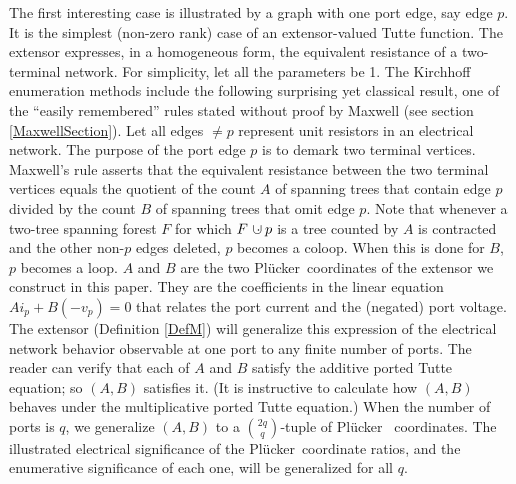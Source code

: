 \documentclass[12pt]{article}
\theoremstyle{definition}
\newcommand{\dunion}
{\mbox{\hbox{\hskip6pt$\cdot$\hskip-5.50pt$\cup$\hskip2pt}}}
\newcommand{\Plucker}{Pl\"{u}cker\ }
\begin{document}
The first interesting case is illustrated by
a graph with one port edge, say edge  $p$.
It is the simplest (non-zero rank) case of an extensor-valued 
Tutte function.  The extensor expresses, in a homogeneous form,
the equivalent resistance of a two-terminal network.
For simplicity, let all the parameters be 1.
The Kirchhoff enumeration methods include the following surprising yet
classical result, one of the ``easily remembered''
rules stated without proof by Maxwell\cite{MaxR}
(see section \ref{MaxwellSection}).
Let all edges $\neq p$ represent unit resistors in an
electrical network.  The purpose of the port edge $p$ is to 
demark two terminal vertices.  Maxwell's rule asserts 
that the equivalent resistance between the two terminal vertices 
equals the quotient of the count $A$ of spanning trees that
contain edge $p$ divided by the count $B$ of spanning trees 
that omit edge $p$.  Note that whenever a two-tree spanning forest $F$ 
for which $F\dunion p$ is a tree counted by $A$ is contracted and the 
other non-$p$ edges deleted,
$p$ becomes a coloop.  When this is done for $B$, $p$ becomes
a loop.  $A$ and $B$ are 
the two \Plucker coordinates of the extensor we construct in this 
paper.  They are the coefficients in the linear equation 
$Ai_p + B(-v_p) = 0$ that relates
the port current and the (negated) port voltage.  The extensor 
(Definition \ref{DefM})
will generalize this expression of the electrical network behavior observable 
at one port to any finite number of ports.
The reader can verify that each of $A$ and $B$ satisfy 
the additive ported Tutte equation;
so $(A,B)$ satisfies it.  
(It is instructive to calculate how $(A,B)$ behaves under the 
multiplicative ported Tutte equation.)
When the number of ports is $q$,
we generalize $(A,B)$ to a $\binom{2q}{q}$-tuple of \Plucker
coordinates.  
The illustrated electrical significance of the
\Plucker coordinate ratios, and the enumerative significance of each
one, will be generalized for all $q$.
\end{document}
